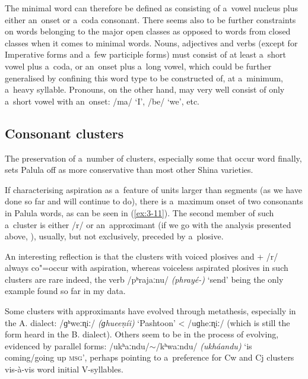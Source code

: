 The minimal word can therefore be defined as consisting of a~vowel nucleus plus either an~onset or a~coda consonant. There seems also to be further constraints on words belonging to the major open classes as opposed to words from closed classes when it comes to minimal words. Nouns, adjectives and verbs (except for Imperative forms and a~few participle forms) must consist of at least a~short vowel plus a~coda, or an~onset plus a~long vowel, which could be further generalised by confining this word type to be constructed of, at a~minimum, a~heavy syllable. Pronouns, on the other hand, may very well consist of only a~short vowel with an~onset: /ma/ `I', /be/ `we', etc.


\subsection{Consonant clusters}
\label{subsec:3-3-2}


The preservation of a~number of clusters, especially some that occur word finally, sets Palula off as more conservative than most other Shina varieties. 


If characterising aspiration as a~feature of units larger than segments (as we have done so far and will continue to do), there is a~maximum onset of two consonants in Palula words, as can be seen in (\ref{ex:3-11}). The second member of such a~cluster is either /r/ or an~approximant (if we go with the analysis presented above, ), usually, but not exclusively, preceded by a~plosive. 


An interesting reflection is that the clusters with voiced plosives and + /r/ always co"=occur with aspiration, whereas voiceless aspirated plosives in such clusters are rare indeed, the verb /pʰrajaːnu/ \textit{(phrayé-)} `send' being the only example found so far in my data. 


Some clusters with approximants have evolved through metathesis, especially in the A. dialect: /ɡʰweːɳiː/ \textit{(ɡhueeṇíi)} `Pashtoon' {\textless} /uɡheːɳiː/ (which is still the form heard in the B. dialect). Others seem to be in the process of evolving, evidenced by parallel forms: /ukʰaːndu/$\sim$/kʰwaːndu/ \textit{(ukháandu)} `is coming/going up \textsc{msg}', perhaps pointing to a~preference for Cw and Cj clusters vis-à-vis word initial V-syllables.



